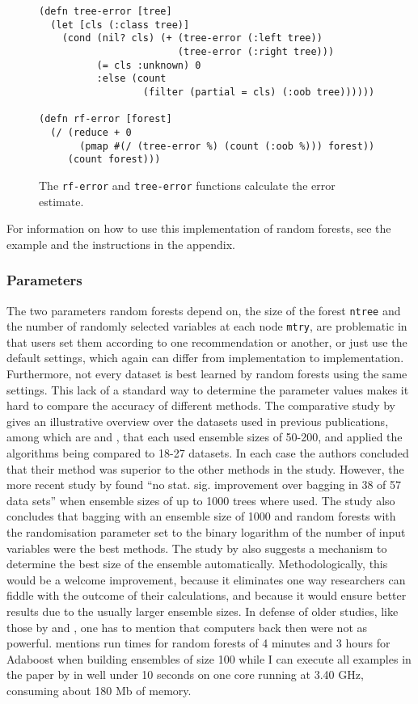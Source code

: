 \documentclass[a4paper,man,12pt,apacite,floatsintext]{apa6} %
\begin{document}
\begin{figure}[H]
\caption{The \texttt{rf-error} and \texttt{tree-error} functions calculate the error estimate.}
\begin{verbatim}
(defn tree-error [tree]
  (let [cls (:class tree)]
    (cond (nil? cls) (+ (tree-error (:left tree))
                        (tree-error (:right tree)))
          (= cls :unknown) 0
          :else (count
                  (filter (partial = cls) (:oob tree))))))

(defn rf-error [forest]
  (/ (reduce + 0
       (pmap #(/ (tree-error %) (count (:oob %))) forest))
     (count forest)))
\end{verbatim}
\end{figure}

For information on how to use this implementation of random forests,
see the example and the instructions in the appendix.

\subsubsection{Parameters}
The two parameters random forests depend on, the size of the forest
\texttt{ntree} and the number of randomly selected variables at each node
\texttt{mtry}, are problematic
in that users set them according to one recommendation or another,
or just use the default settings, which again can differ from implementation
to implementation.
Furthermore, not every dataset is best learned by random forests using the
same settings.
This lack of a standard way to determine the parameter values makes it hard
to compare the accuracy of different methods.
The comparative study by  gives an
illustrative overview over the datasets used in previous publications,
among which are  and ,
that each used ensemble sizes of 50-200, and applied the algorithms being
compared to 18-27 datasets.
In each case the authors concluded that their method was superior to the
other methods in the study.
However, the more recent study by  found
“no stat. sig. improvement over bagging in 38 of 57 data sets”
when ensemble sizes of up to 1000 trees where used.
The study also concludes that bagging with an ensemble size of 1000 and
random forests with the randomisation parameter set to the
binary logarithm of the number of input variables were the best methods.
The study by  also suggests a mechanism
to determine the best size of the ensemble automatically.
Methodologically, this would be a welcome improvement, because it eliminates
one way researchers can fiddle with the outcome of their calculations,
and because it would ensure better results due to the usually larger
ensemble sizes.
In defense of older studies, like those by  and
, one has to mention that
computers back then were not as powerful.
 mentions run times for random forests of 4 minutes
and 3 hours for Adaboost when building ensembles of size 100
while I can execute all examples in the paper by 
in well under 10 seconds on one core running at 3.40 GHz, consuming about 180 Mb
of memory.
\end{document}
